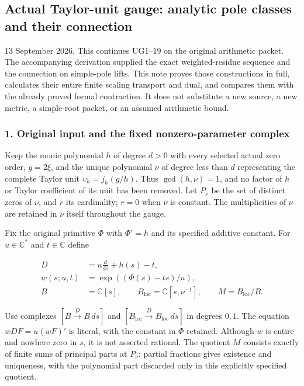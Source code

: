 \subsection{Actual Taylor-unit gauge: analytic pole classes and their connection}\label{endpoint-analytic_pole--actual-taylor-unit-gauge-analytic-pole-classes-and-their-connection}

13 September 2026. This continues UG1--19 on the original arithmetic packet. The accompanying derivation supplied the exact weighted-residue sequence and the connection on simple-pole lifts. This note proves those constructions in full, calculates their entire finite scaling transport and dual, and compares them with the already proved formal contraction. It does not substitute a new source, a new metric, a simple-root packet, or an assumed arithmetic bound.

\subsubsection{1. Original input and the fixed nonzero-parameter complex}\label{endpoint-analytic_pole--original-input-and-the-fixed-nonzero-parameter-complex}

Keep the monic polynomial \(h\) of degree \(d>0\) with every selected actual zero order, \(g=2\xi\), and the unique polynomial \(\nu\) of degree less than \(d\) representing the complete Taylor unit \(\upsilon_h=j_h(g/h)\). Thus \(\gcd(h,\nu)=1\), and no factor of \(h\) or Taylor coefficient of its unit has been removed. Let \(P_{\nu}\) be the set of distinct zeros of \(\nu\), and \(r\) its cardinality; \(r=0\) when \(\nu\) is constant. The multiplicities of \(\nu\) are retained in \(\nu\) itself throughout the gauge.

Fix the original primitive \(\Phi\) with \(\Phi'=h\) and its specified additive constant. For \(u\in\mathbb{C}^{*}\) and \(t\in\mathbb{C}\) define

\[
\begin{aligned}
D&=u\frac{d}{ds}+h(s)-t,\\
w(s;u,t)&=\exp((\Phi(s)-t s)/u),\\
B&=\mathbb C[s],\qquad B_{\mathrm{loc}}=\mathbb C[s,\nu^{-1}],
\qquad M=B_{\mathrm{loc}}/B.
\end{aligned}
\tag{AP1}
\]

Use complexes \([B\xrightarrow{D}B\,ds]\) and \([B_{\mathrm{loc}}\xrightarrow{D}B_{\mathrm{loc}}\,ds]\) in degrees \(0,1\). The equation \(w D F = u (w F)'\) is literal, with the constant in \(\Phi\) retained. Although \(w\) is entire and nowhere zero in \(s\), it is not asserted rational. The quotient \(M\) consists exactly of finite sums of principal parts at \(P_{\nu}\): partial fractions gives existence and uniqueness, with the polynomial part discarded only in this explicitly specified quotient.


